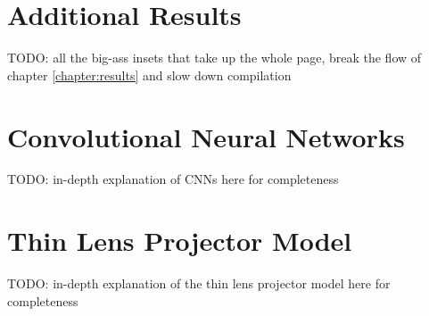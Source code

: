 \chapter{Additional Results}
\label{chapter:appendix-results}

{\color{red} TODO: all the big-ass insets that take up the whole page, break the flow of chapter \ref{chapter:results} and slow down compilation}

\chapter{Convolutional Neural Networks}
\label{chapter:appendix-cnns}

{\color{red} TODO: in-depth explanation of CNNs here for completeness}

\chapter{Thin Lens Projector Model}
\label{chapter:appendix-projector}

{\color{red} TODO: in-depth explanation of the thin lens projector model here for completeness}
